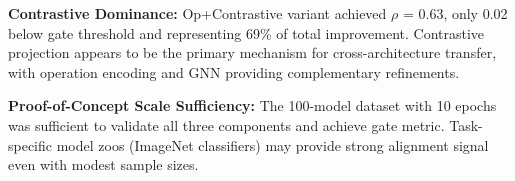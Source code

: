 \textbf{Contrastive Dominance:} Op+Contrastive variant achieved $\rho$ = 0.63, only 0.02 below gate threshold and representing 69\% of total improvement. Contrastive projection appears to be the primary mechanism for cross-architecture transfer, with operation encoding and GNN providing complementary refinements.

\textbf{Proof-of-Concept Scale Sufficiency:} The 100-model dataset with 10 epochs was sufficient to validate all three components and achieve gate metric. Task-specific model zoos (ImageNet classifiers) may provide strong alignment signal even with modest sample sizes.
